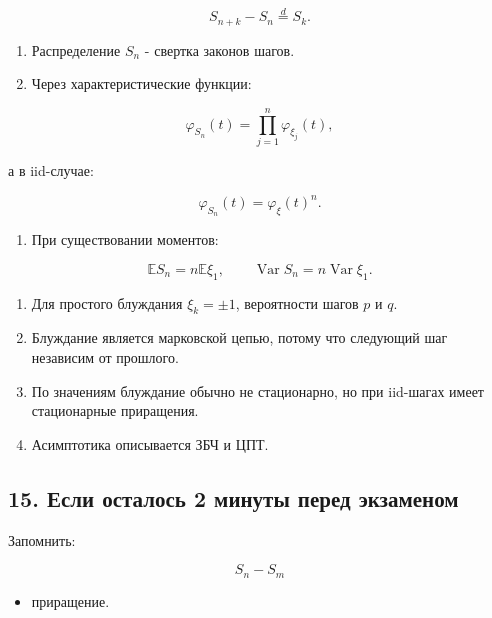 \documentclass[
  11pt,
  a4paper,
]{article}
\providecommand{\tightlist}{%
  \setlength{\itemsep}{0pt}\setlength{\parskip}{0pt}}
\begin{document}
\[
S_{n+k}-S_n\stackrel d=S_k.
\]

\begin{enumerate}
\def\labelenumi{\arabic{enumi}.}
\setcounter{enumi}{5}
\tightlist
\item
  Распределение \(S_n\) - свертка законов шагов.
\item
  Через характеристические функции:
\end{enumerate}

\[
\varphi_{S_n}(t)=\prod_{j=1}^n\varphi_{\xi_j}(t),
\]

а в iid-случае:

\[
\varphi_{S_n}(t)=\varphi_\xi(t)^n.
\]

\begin{enumerate}
\def\labelenumi{\arabic{enumi}.}
\setcounter{enumi}{7}
\tightlist
\item
  При существовании моментов:
\end{enumerate}

\[
\mathbb ES_n=n\mathbb E\xi_1,
\qquad
\operatorname{Var}S_n=n\operatorname{Var}\xi_1.
\]

\begin{enumerate}
\def\labelenumi{\arabic{enumi}.}
\setcounter{enumi}{8}
\tightlist
\item
  Для простого блуждания \(\xi_k=\pm1\), вероятности шагов \(p\) и
  \(q\).
\item
  Блуждание является марковской цепью, потому что следующий шаг
  независим от прошлого.
\item
  По значениям блуждание обычно не стационарно, но при iid-шагах имеет
  стационарные приращения.
\item
  Асимптотика описывается ЗБЧ и ЦПТ.
\end{enumerate}

\subsection{15. Если осталось 2 минуты перед
экзаменом}\label{ux435ux441ux43bux438-ux43eux441ux442ux430ux43bux43eux441ux44c-2-ux43cux438ux43dux443ux442ux44b-ux43fux435ux440ux435ux434-ux44dux43aux437ux430ux43cux435ux43dux43eux43c}

Запомнить:

\[
S_n-S_m
\]

\begin{itemize}
\tightlist
\item
  приращение.
\end{itemize}
\end{document}
